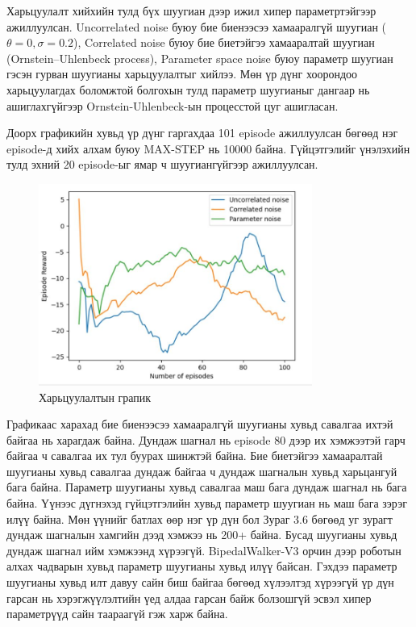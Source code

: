 \documentclass[12pt,A4]{report}
\begin{document}
Харьцуулалт хийхийн тулд бүх шуугиан дээр ижил хипер параметртэйгээр ажиллуулсан.  Uncorrelated noise буюу бие биенээсээ хамааралгүй шуугиан ($\theta=0, \sigma=0.2$), Correlated noise буюу бие биетэйгээ хамааралтай шуугиан (Ornstein–Uhlenbeck process), Parameter space noise буюу параметр шуугиан гэсэн гурван шуугианы харьцуулалтыг хийлээ. Мөн үр дүнг хоорондоо харьцуулагдах боломжтой болгохын тулд параметр шуугианыг дангаар нь ашиглахгүйгээр Ornstein-Uhlenbeck-ын процесстой цуг ашигласан.

Доорх графикийн хувьд үр дүнг гаргахдаа 101 episode ажиллуулсан бөгөөд нэг episode-д хийх алхам буюу MAX-STEP нь 10000 байна. Гүйцэтгэлийг үнэлэхийн тулд эхний 20 episode-ыг ямар ч шуугиангүйгээр ажиллуулсан. 

\begin{figure}[H]
\centering
\includegraphics[width=0.8\textwidth]{./images/comperation-3}
\caption{Харьцуулалтын грапик}
\end{figure}

Графикаас харахад бие биенээсээ хамааралгүй шуугианы хувьд савалгаа ихтэй байгаа нь харагдаж байна. Дундаж шагнал нь episode 80 дээр их хэмжээтэй гарч байгаа ч савалгаа их тул буурах шинжтэй байна. Бие биетэйгээ хамааралтай шуугианы хувьд савалгаа дундаж байгаа ч дундаж шагналын хувьд харьцангуй бага байна. Параметр шуугианы хувьд  савалгаа маш бага дундаж шагнал нь бага байна. Үүнээс дүгнэхэд гүйцэтгэлийн хувьд параметр шуугиан нь маш бага зэрэг илүү байна. Мөн үүнийг батлах өөр нэг үр дүн бол Зураг 3.6 бөгөөд уг зурагт дундаж шагналын хамгийн дээд хэмжээ нь 200+ байна. Бусад шуугианы хувьд дундаж шагнал ийм хэмжээнд хүрээгүй. BipedalWalker-V3 орчин дээр роботын алхах чадварын хувьд параметр шуугианы хувьд илүү байсан. Гэхдээ параметр шуугианы хувьд илт давуу сайн биш байгаа бөгөөд хүлээлтэд хүрээгүй үр дүн гарсан нь хэрэгжүүлэлтийн үед алдаа гарсан байж болзошгүй эсвэл хипер параметрүүд сайн таараагүй гэж харж байна.
\end{document}
